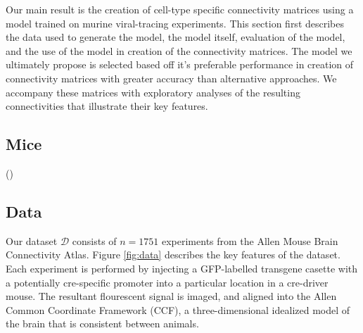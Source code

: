 \documentclass[NETN,manuscript]{stjour-new}
\newcommand{\skcomment}[1]{({\color{blue}{SK's comment:}}\textbf{\color{blue}{#1}})}
\begin{document}

Our main result is the creation of cell-type specific connectivity matrices using a model trained on murine viral-tracing experiments.
This section first describes the data used to generate the model, the model itself, evaluation of the model, and the use of the model in creation of the connectivity matrices.
The model we ultimately propose is selected based off it's preferable performance in creation of connectivity matrices with greater accuracy than alternative approaches.
We accompany these matrices with exploratory analyses of the resulting connectivities that illustrate their key features. 

\subsection{Mice}

\skcomment{Experiments involving mice were approved by the Institutional Animal Care and Use Committees of the Allen Institute for Brain Science in accordance with NIH guidelines.}

\subsection{Data}

Our dataset $\mathcal D$ consists of $n=1751$ experiments from the Allen Mouse Brain Connectivity Atlas.
Figure \ref{fig:data} describes the key features of the dataset.
Each experiment is performed by injecting a GFP-labelled transgene casette with a potentially cre-specific promoter into a particular location in a cre-driver mouse.
The resultant flourescent signal is imaged, and aligned into the Allen Common Coordinate Framework (CCF), a three-dimensional idealized model of the brain that is consistent between animals.
\end{document}
